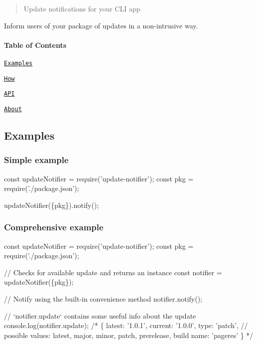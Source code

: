 \begin{quote}
Update notifications for your C\+LI app \end{quote}




Inform users of your package of updates in a non-\/intrusive way.

\paragraph*{Table of Contents}


\begin{DoxyItemize}
\item \href{#examples}{\tt Examples}
\item \href{#how}{\tt How}
\item \href{#api}{\tt A\+PI}
\item \href{#about}{\tt About}
\end{DoxyItemize}

\subsection*{Examples}

\subsubsection*{Simple example}


\begin{DoxyCode}
const updateNotifier = require('update-notifier');
const pkg = require('./package.json');

updateNotifier(\{pkg\}).notify();
\end{DoxyCode}


\subsubsection*{Comprehensive example}


\begin{DoxyCode}
const updateNotifier = require('update-notifier');
const pkg = require('./package.json');

// Checks for available update and returns an instance
const notifier = updateNotifier(\{pkg\});

// Notify using the built-in convenience method
notifier.notify();

// `notifier.update` contains some useful info about the update
console.log(notifier.update);
/*
\{
    latest: '1.0.1',
    current: '1.0.0',
    type: 'patch', // possible values: latest, major, minor, patch, prerelease, build
    name: 'pageres'
\}
*/
\end{DoxyCode}


